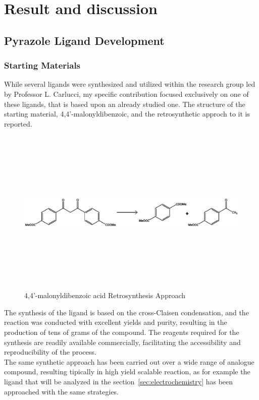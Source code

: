 \documentclass[../Master.tex]{subfiles}
\begin{document}
\chapter{Result and discussion}

\section{Pyrazole Ligand Development}\label{sec:pyr-dev}

\subsection{Starting Materials}\label{sec:starting-materials}

While several ligands were synthesized and utilized within the research group led by Professor L. Carlucci, my specific contribution focused exclusively on one of these ligands, that is based upon an already studied one. The structure of the starting material, 4,4’-malonyldibenzoic, and the retrosynthetic approch to it is reported.

\begin{figure}[h]
	\centering
	\includegraphics[width=16cm,height=8cm,keepaspectratio]{Structures/dikest2-retro.eps}
	\caption{4,4’-malonyldibenzoic acid Retrosynthesis Approach}\label{fig:dikest2-retro}
\end{figure}

The synthesis of the ligand is based on the cross-Claisen condensation, and the reaction was conducted with excellent yields and purity, resulting in the production of tens of grams of the compound. The reagents required for the synthesis are readily available commercially, facilitating the accessibility and reproducibility of the process. \\
The same synthetic approach has been carried out over a wide range of analogue compound, resulting tipically in high yield scalable reaction, as for example the ligand that will be analyzed in the section\ \ref{sec:electrochemistry} has been approached with the same strategies.
\newpage
\end{document}
